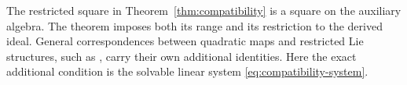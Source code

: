 \begin{remark}
The restricted square in Theorem~\ref{thm:compatibility} is a square on
the auxiliary algebra. The theorem imposes both its range and its
restriction to the derived ideal. General correspondences between
quadratic maps and restricted Lie structures, such as
\cite[Section~9]{Pakianathan2007}, carry their own additional identities.
Here the exact additional condition is the solvable linear system
\eqref{eq:compatibility-system}.
\end{remark}
